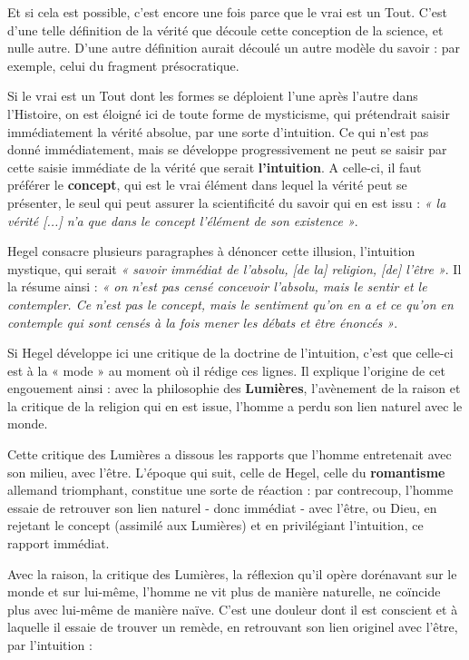Et si cela est possible, c’est encore une fois parce que le vrai est un Tout. C’est d’une telle définition de la vérité que découle cette conception de la science, et nulle autre. D’une autre définition aurait découlé un autre modèle du savoir : par exemple, celui du fragment présocratique.

Si le vrai est un Tout dont les formes se déploient l’une après l’autre dans l’Histoire, on est éloigné ici de toute forme de mysticisme, qui prétendrait saisir immédiatement la vérité absolue, par une sorte d’intuition. Ce qui n’est pas donné immédiatement, mais se développe progressivement ne peut se saisir par cette saisie immédiate de la vérité que serait {\bf l’intuition}. A celle-ci, il faut préférer le {\bf concept}, qui est le vrai élément dans lequel la vérité peut se présenter, le seul qui peut assurer la scientificité du savoir qui en est issu : {\it « la vérité [...] n’a que dans le concept l’élément de son existence »}.

Hegel consacre plusieurs paragraphes à dénoncer cette illusion, l’intuition mystique, qui serait {\it « savoir immédiat de l’absolu, [de la] religion, [de] l’être »}. Il la résume ainsi : {\it « on n’est pas censé concevoir l’absolu, mais le sentir et le contempler. Ce n’est pas le concept, mais le sentiment qu’on en a et ce qu’on en contemple qui sont censés à la fois mener les débats et être énoncés »}.

Si Hegel développe ici une critique de la doctrine de l’intuition, c’est que celle-ci est à la « mode » au moment où il rédige ces lignes. Il explique l’origine de cet engouement ainsi : avec la philosophie des {\bf Lumières}, l’avènement de la raison et la critique de la religion qui en est issue, l’homme a perdu son lien naturel avec le monde.

Cette critique des Lumières a dissous les rapports que l’homme entretenait avec son milieu, avec l’être. L’époque qui suit, celle de Hegel, celle du {\bf romantisme} allemand triomphant, constitue une sorte de réaction : par contrecoup, l’homme essaie de retrouver son lien naturel - donc immédiat - avec l’être, ou Dieu, en rejetant le concept (assimilé aux Lumières) et en privilégiant l’intuition, ce rapport immédiat.

Avec la raison, la critique des Lumières, la réflexion qu’il opère dorénavant sur le monde et sur lui-même, l’homme ne vit plus de manière naturelle, ne coïncide plus avec lui-même de manière naïve. C’est une douleur dont il est conscient et à laquelle il essaie de trouver un remède, en retrouvant son lien originel avec l’être, par l’intuition :

